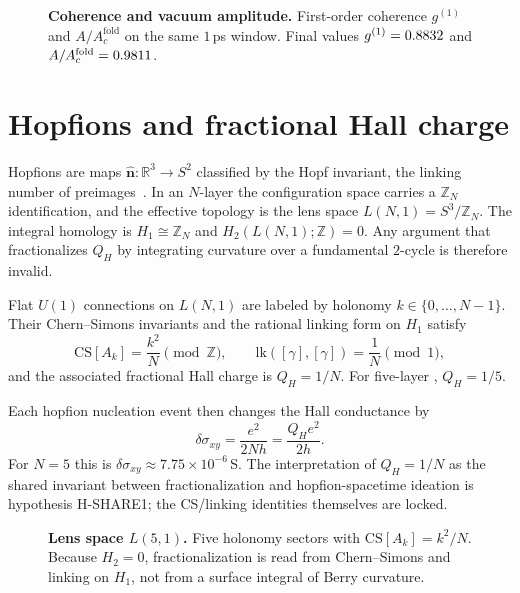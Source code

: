 \documentclass[11pt,letterpaper]{article}
\begin{document}
\begin{figure}[H]
\centering

\caption{\textbf{Coherence and vacuum amplitude.} First-order coherence $g^{(1)}$ and $A/A_c^{\mathrm{fold}}$ on the same $1$\,ps window. Final values $g^{(1)}=0.8832$ and $A/A_c^{\mathrm{fold}}=0.9811$.}
\label{fig:g1A}
\end{figure}

\section{Hopfions and fractional Hall charge}
\label{sec:hopf}

Hopfions are maps $\hat{\mathbf{n}}:\mathbb{R}^3\to S^2$ classified by the Hopf invariant, the linking number of preimages~\cite{Faddeev1997,Sutcliffe2007,Ackerman2017,Kent2021}. In an $N$-layer \TEVC{} the configuration space carries a $\mathbb{Z}_N$ identification, and the effective topology is the lens space $L(N,1)=S^3/\mathbb{Z}_N$. The integral homology is $H_1\cong\mathbb{Z}_N$ and $H_2(L(N,1);\mathbb{Z})=0$. Any argument that fractionalizes $Q_H$ by integrating curvature over a fundamental $2$-cycle is therefore invalid.

\begin{theorem}
\label{thm:qh}
Flat $U(1)$ connections on $L(N,1)$ are labeled by holonomy $k\in\{0,\ldots,N-1\}$. Their Chern--Simons invariants and the rational linking form on $H_1$ satisfy~\cite{Witten1989,Jeffrey1992}
\begin{equation}
\mathrm{CS}[A_k]=\frac{k^2}{N}\pmod{\mathbb{Z}},\qquad
\mathrm{lk}([\gamma],[\gamma])=\frac1N\pmod 1,
\end{equation}
and the associated fractional Hall charge is $Q_H=1/N$. For five-layer \MATBG{}, $Q_H=1/5$.
\end{theorem}

Each hopfion nucleation event then changes the Hall conductance by
\begin{equation}
\delta\sigma_{xy}=\frac{e^2}{2Nh}=\frac{Q_H e^2}{2h}.
\end{equation}
For $N=5$ this is $\delta\sigma_{xy}\approx 7.75\times 10^{-6}$\,S. The interpretation of $Q_H=1/N$ as the shared invariant between \QVC{} fractionalization and hopfion-spacetime ideation is hypothesis H-SHARE1; the CS/linking identities themselves are locked.

\begin{figure}[H]
\centering

\caption{\textbf{Lens space $L(5,1)$.} Five holonomy sectors with $\mathrm{CS}[A_k]=k^2/N$. Because $H_2=0$, fractionalization is read from Chern--Simons and linking on $H_1$, not from a surface integral of Berry curvature.}
\label{fig:lens}
\end{figure}
\end{document}

